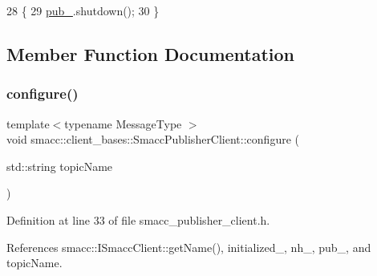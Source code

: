 \begin{DoxyCode}
28   \{
29     \hyperlink{classsmacc_1_1client__bases_1_1SmaccPublisherClient_af39f498e73e8f956aae312065a4fd093}{pub\_}.shutdown();
30   \}
\end{DoxyCode}


\subsection{Member Function Documentation}
\mbox{\label{classsmacc_1_1client__bases_1_1SmaccPublisherClient_ade7a2549ada725b8342633137eb6ad53}} 
\subsubsection{\texorpdfstring{configure()}{configure()}}
{\footnotesize\ttfamily template$<$typename Message\+Type $>$ \\
void smacc\+::client\+\_\+bases\+::\+Smacc\+Publisher\+Client\+::configure (\begin{DoxyParamCaption}\item[{std\+::string}]{topic\+Name }\end{DoxyParamCaption})\hspace{0.3cm}{\ttfamily [inline]}}



Definition at line 33 of file smacc\+\_\+publisher\+\_\+client.\+h.



References smacc\+::\+I\+Smacc\+Client\+::get\+Name(), initialized\+\_\+, nh\+\_\+, pub\+\_\+, and topic\+Name.


